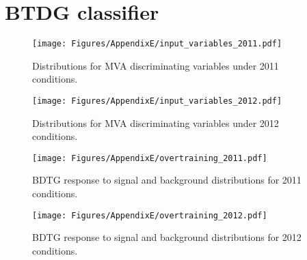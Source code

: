 
\chapter{BTDG classifier}
\label{BTDG}

\begin{figure}[h]
\begin{center}
\texttt{[image: Figures/AppendixE/input\_variables\_2011.pdf]}
\caption{Distributions for MVA discriminating variables under 2011 conditions.}
\label{TMVA_input_variables_2011}
\end{center}
\end{figure}

\begin{figure}[h]
\begin{center}
\texttt{[image: Figures/AppendixE/input\_variables\_2012.pdf]}
\caption{Distributions for MVA discriminating variables under 2012 conditions.}
\label{TMVA_input_variables_2012}
\end{center}
\end{figure}

\begin{figure}[h]
\begin{center}
\texttt{[image: Figures/AppendixE/overtraining\_2011.pdf]}
\caption{BDTG response to signal and background distributions for 2011 conditions.}
\label{TMVA_overtraining_2011}
\end{center}
\end{figure}

\begin{figure}[h]
\begin{center}
\texttt{[image: Figures/AppendixE/overtraining\_2012.pdf]}
\caption{BDTG response to signal and background distributions for 2012 conditions.}
\label{TMVA_overtraining_2012}
\end{center}
\end{figure}
